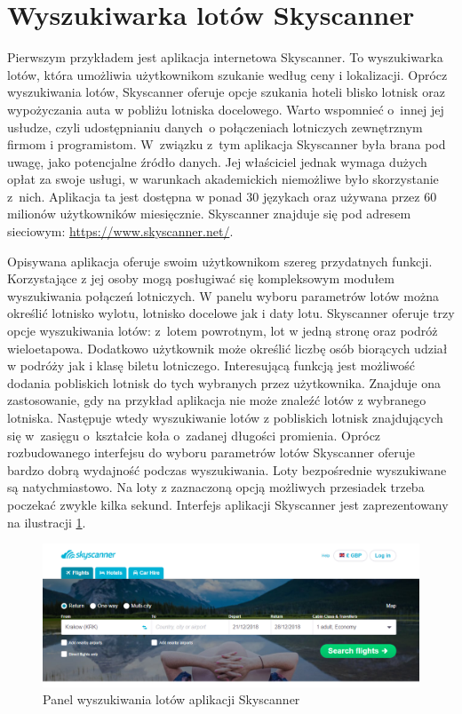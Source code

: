\documentclass[12pt, twoside]{report}
\begin{document}
\section{Wyszukiwarka lotów Skyscanner}
Pierwszym przykładem jest aplikacja internetowa Skyscanner. To wyszukiwarka lotów, która umożliwia użytkownikom szukanie według ceny i lokalizacji. Oprócz wyszukiwania lotów, Skyscanner oferuje opcje szukania hoteli blisko lotnisk oraz wypożyczania auta w pobliżu lotniska docelowego. Warto wspomnieć o~innej jej usłudze, czyli udostępnianiu danych~o połączeniach lotniczych zewnętrznym firmom i programistom. W~związku z~tym aplikacja Skyscanner była brana pod uwagę, jako potencjalne źródło danych. Jej właściciel jednak wymaga dużych opłat za swoje usługi, w warunkach akademickich niemożliwe było skorzystanie z~nich.
Aplikacja ta jest dostępna w ponad 30 językach oraz używana przez 60 milionów użytkowników miesięcznie\cite{skyscanner}. Skyscanner znajduje się pod adresem sieciowym: 
\url{https://www.skyscanner.net/}.

Opisywana aplikacja oferuje swoim użytkownikom szereg przydatnych funkcji. Korzystające z jej osoby mogą posługiwać się kompleksowym modułem wyszukiwania połączeń lotniczych. W panelu wyboru parametrów lotów można określić lotnisko wylotu, lotnisko docelowe jak i daty lotu. Skyscanner oferuje trzy opcje wyszukiwania lotów: z~lotem powrotnym, lot w jedną stronę oraz podróż wieloetapowa. Dodatkowo użytkownik może określić liczbę osób biorących udział w podróży jak i klasę biletu lotniczego. Interesującą funkcją jest możliwość dodania pobliskich lotnisk do tych wybranych przez użytkownika. Znajduje ona zastosowanie, gdy na przykład aplikacja nie może znaleźć lotów z wybranego lotniska. Następuje wtedy wyszukiwanie lotów z pobliskich lotnisk znajdujących się w~zasięgu o~kształcie koła o~zadanej długości promienia.
Oprócz rozbudowanego interfejsu do wyboru parametrów lotów Skyscanner oferuje bardzo dobrą wydajność podczas wyszukiwania. Loty bezpośrednie wyszukiwane są natychmiastowo. Na loty z zaznaczoną opcją możliwych przesiadek trzeba poczekać zwykle kilka sekund. Interfejs aplikacji Skyscanner jest zaprezentowany na ilustracji \ref{fig:skyscanner_main}.

\begin{figure}[!ht]
\centering
\includegraphics[scale=0.50, keepaspectratio]{skyscanner_main.png}
\caption{Panel wyszukiwania lotów aplikacji Skyscanner}
\label{fig:skyscanner_main}
\end{figure}
\end{document}
